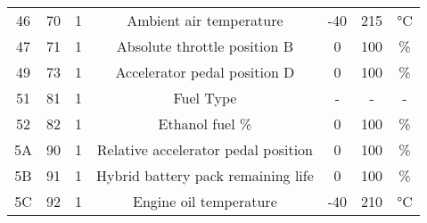 \begin{table}[]
\begin{tabular}{ccccccc}
46                                        & 70                                       & 1                                                   & Ambient air temperature                     & -40                                       & 215                                       & °C                                    \\
47                                        & 71                                       & 1                                                   & Absolute throttle position B                & 0                                         & 100                                       & \%                                    \\
49                                        & 73                                       & 1                                                   & Accelerator pedal position D                & 0                                         & 100                                       & \%                                    \\
51                                        & 81                                       & 1                                                   & Fuel Type                                   & -                                         & -                                         & -                                     \\
52                                        & 82                                       & 1                                                   & Ethanol fuel \%                             & 0                                         & 100                                       & \%                                    \\
5A                                        & 90                                       & 1                                                   & Relative accelerator pedal position         & 0                                         & 100                                       & \%                                    \\
5B                                        & 91                                       & 1                                                   & Hybrid battery pack remaining life          & 0                                         & 100                                       & \%                                    \\
5C                                        & 92                                       & 1                                                   & Engine oil temperature                      & -40                                       & 210                                       & °C                                    \\

\end{tabular}
\end{table}
